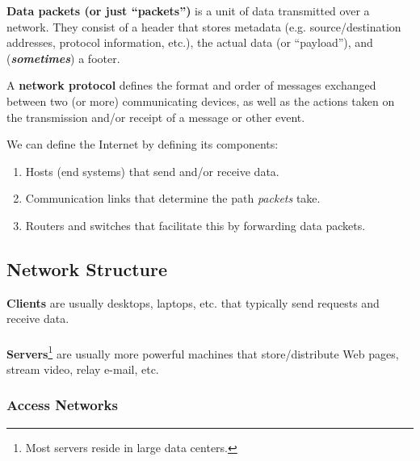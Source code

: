 \documentclass{report}
\newcommand{\definition}[2]{\begin{tcolorbox}[title={Definition: #1}]{#2}\end{tcolorbox}}
\begin{document}
\definition{Data Packets}{\textbf{Data packets (or just ``packets'')} is a unit of data transmitted
  over a network. They consist of a header that stores metadata (e.g. source/destination addresses,
  protocol information, etc.), the actual data (or ``payload''), and (\textit{\textbf{sometimes}}) a
  footer.}

\definition{Network Protocol}{A \textbf{network protocol} defines the format and order of messages
  exchanged between two (or more) communicating devices, as well as the actions taken on the
  transmission and/or receipt of a message or other event.}

We can define the Internet by defining its components:
\begin{enumerate}[label=\textit{(\roman*)}]
\item Hosts (end systems) that send and/or receive data.
\item Communication links that determine the path \textit{packets} take.
\item Routers and switches that facilitate this by forwarding data packets.
\end{enumerate}


\subsection{Network Structure}
\definition{Network Edge}{}
\definition{Client and Server}{\textbf{Clients} are usually desktops, laptops, etc. that typically
  send requests and receive data. \\ \\
  \textbf{Servers}\footnote{Most servers reside in large data
    centers.} are usually more powerful machines that store/distribute Web pages, stream video, relay
  e-mail, etc.}

\subsubsection{Access Networks}
\end{document}
